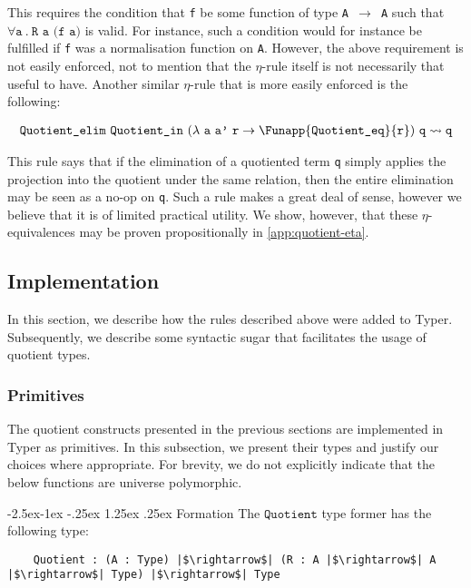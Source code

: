 \documentclass[12pt,twoside,maitrise]{dms}
\makeatletter
\theoremstyle{definition}
\numberwithin{equation}{section}
\numberwithin{table}{chapter}
\numberwithin{figure}{chapter}
\newcommand\id[1] {\texttt{#1}}
\newcommand\fn[1] {\texttt{#1}}
\renewcommand\paragraph{\@startsection{paragraph}{4}{\z@}%
            {-2.5ex\@plus -1ex \@minus -.25ex}%
            {1.25ex \@plus .25ex}%
            {\normalfont\normalsize\bfseries}}
\makeatother
\begin{document}
This requires the condition that \id{f} be some function of type \fn{A
  $\rightarrow$ A} such that $\forall \id{a} \ . \ \fn{R a (f a)}$ is valid. For
instance, such a condition would for instance be fulfilled if \id{f} was a
normalisation function on \id{A}. However, the above requirement is not easily
enforced, not to mention that the $\eta$-rule itself is not necessarily that
useful to have. Another similar $\eta$-rule that is more easily enforced is the
following:

\begin{align*}
  & \fn{Quotient\_elim} \ \id{Quotient\_in} \ (\lambda \ \id{a} \ \id{a'} \ \id{r} \rightarrow \Funapp{\id{Quotient\_eq}}{\id{r}}) \ \id{q} \rightsquigarrow{} \id{q} \\
\end{align*}

This rule says that if the elimination of a quotiented term \id{q} simply
applies the projection into the quotient under the same relation, then the
entire elimination may be seen as a no-op on \id{q}. Such a rule makes a great
deal of sense, however we believe that it is of limited practical utility. We
show, however, that these $\eta$-equivalences may be proven propositionally in
\autoref{app:quotient-eta}.

\subsection{Implementation}

In this section, we describe how the rules described above were added to Typer.
Subsequently, we describe some syntactic sugar that facilitates the usage of
quotient types.

\subsubsection{Primitives}

The quotient constructs presented in the previous sections are implemented in
Typer as primitives. In this subsection, we present their types and justify our
choices where appropriate. For brevity, we do not explicitly indicate that the
below functions are universe polymorphic.

\paragraph{Formation}
The $\id{Quotient}$ type former has the following type:

\begin{verbatim}
    Quotient : (A : Type) |$\rightarrow$| (R : A |$\rightarrow$| A |$\rightarrow$| Type) |$\rightarrow$| Type
\end{verbatim}
\end{document}
